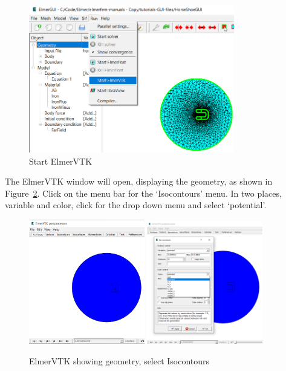 \begin{figure}[H]
\begin{center}
\includegraphics[width=0.8\textwidth]{vtk-1}
\caption{Start ElmerVTK}\label{fg:vtk-1}
\end{center}
\end{figure}

The ElmerVTK window will open, displaying the geometry,  as shown in Figure~\ref{fg:vtk-2}.  Click on the menu bar for the `Isocontours' menu.  In two places, variable and color, click for the drop down menu and select `potential'.

\begin{figure}[H]
\begin{center}
\includegraphics[width=0.45\textwidth]{vtk-2}
\includegraphics[width=0.45\textwidth]{vtk-3}
\caption{ElmerVTK showing geometry, select Isocontours}\label{fg:vtk-2}
\end{center}
\end{figure}

